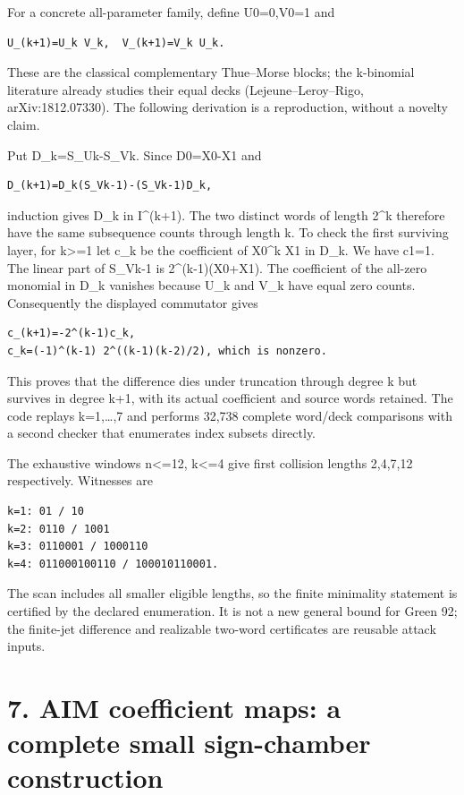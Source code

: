\documentclass[
  10pt,
]{scrreprt}
\begin{document}
For a concrete all-parameter family, define U0=0,V0=1 and

\begin{verbatim}
U_(k+1)=U_k V_k,  V_(k+1)=V_k U_k.
\end{verbatim}

These are the classical complementary Thue--Morse blocks; the k-binomial
literature already studies their equal decks (Lejeune--Leroy--Rigo,
arXiv:1812.07330). The following derivation is a reproduction, without a
novelty claim.

Put D\_k=S\_Uk-S\_Vk. Since D0=X0-X1 and

\begin{verbatim}
D_(k+1)=D_k(S_Vk-1)-(S_Vk-1)D_k,
\end{verbatim}

induction gives D\_k in I\^{}(k+1). The two distinct words of length
2\^{}k therefore have the same subsequence counts through length k. To
check the first surviving layer, for k\textgreater=1 let c\_k be the
coefficient of X0\^{}k X1 in D\_k. We have c1=1. The linear part of
S\_Vk-1 is 2\^{}(k-1)(X0+X1). The coefficient of the all-zero monomial
in D\_k vanishes because U\_k and V\_k have equal zero counts.
Consequently the displayed commutator gives

\begin{verbatim}
c_(k+1)=-2^(k-1)c_k,
c_k=(-1)^(k-1) 2^((k-1)(k-2)/2), which is nonzero.
\end{verbatim}

This proves that the difference dies under truncation through degree k
but survives in degree k+1, with its actual coefficient and source words
retained. The code replays k=1,\ldots,7 and performs 32,738 complete
word/deck comparisons with a second checker that enumerates index
subsets directly.

The exhaustive windows n\textless=12, k\textless=4 give first collision
lengths 2,4,7,12 respectively. Witnesses are

\begin{verbatim}
k=1: 01 / 10
k=2: 0110 / 1001
k=3: 0110001 / 1000110
k=4: 011000100110 / 100010110001.
\end{verbatim}

The scan includes all smaller eligible lengths, so the finite minimality
statement is certified by the declared enumeration. It is not a new
general bound for Green 92; the finite-jet difference and realizable
two-word certificates are reusable attack inputs.

\section{7. AIM coefficient maps: a complete small sign-chamber
construction}\label{edition-3-section-7}
\end{document}
